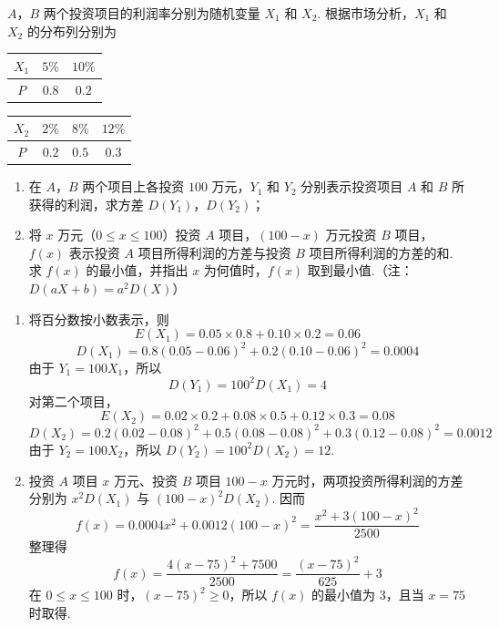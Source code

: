 \begin{problem}
\(A\)，\(B\) 两个投资项目的利润率分别为随机变量 \(X_{1}\) 和 \(X_{2}\). 根据市场分析，\(X_{1}\) 和 \(X_{2}\) 的分布列分别为

\begin{center}
\begin{tabular}{c|cc}
\hline
\(X_1\) & \(5\%\) & \(10\%\) \\
\hline
\(P\) & \(0.8\) & \(0.2\) \\
\hline
\end{tabular}
\qquad
\begin{tabular}{c|ccc}
\hline
\(X_2\) & \(2\%\) & \(8\%\) & \(12\%\) \\
\hline
\(P\) & \(0.2\) & \(0.5\) & \(0.3\) \\
\hline
\end{tabular}
\end{center}

\begin{enumerate}
\item 在 \(A\)，\(B\) 两个项目上各投资 \(100\text{ 万元}\)，\(Y_{1}\) 和 \(Y_{2}\) 分别表示投资项目 \(A\) 和 \(B\) 所获得的利润，求方差 \(D(Y_1)\)，\(D(Y_2)\)；
\item 将 \(x\text{ 万元}\)（\(0 \leqslant x \leqslant 100\)）投资 \(A\) 项目，\((100-x)\text{ 万元}\)投资 \(B\) 项目，\(f(x)\) 表示投资 \(A\) 项目所得利润的方差与投资 \(B\) 项目所得利润的方差的和. 求 \(f(x)\) 的最小值，并指出 \(x\) 为何值时，\(f(x)\) 取到最小值.（注：\(D(aX+b)=a^{2}D(X)\)）
\end{enumerate}

\begin{solution}
\begin{enumerate}
\item 将百分数按小数表示，则
\[
E(X_1)=0.05\times0.8+0.10\times0.2=0.06
\]
\[
D(X_1)=0.8\left(0.05-0.06\right)^2+0.2\left(0.10-0.06\right)^2=0.0004
\]
由于 \(Y_1=100X_1\)，所以
\[
D(Y_1)=100^2D(X_1)=4
\]
对第二个项目，
\[
E(X_2)=0.02\times0.2+0.08\times0.5+0.12\times0.3=0.08
\]
\[
D(X_2)=0.2\left(0.02-0.08\right)^2+0.5\left(0.08-0.08\right)^2+0.3\left(0.12-0.08\right)^2=0.0012
\]
由于 \(Y_2=100X_2\)，所以 \(D(Y_2)=100^2D(X_2)=12\).
\item 投资 \(A\) 项目 \(x\) 万元、投资 \(B\) 项目 \(100-x\) 万元时，两项投资所得利润的方差分别为 \(x^2D(X_1)\) 与 \((100-x)^2D(X_2)\). 因而
\[
f(x)=0.0004x^2+0.0012(100-x)^2
=\frac{x^2+3(100-x)^2}{2500}
\]
整理得
\[
f(x)=\frac{4(x-75)^2+7500}{2500}=\frac{(x-75)^2}{625}+3
\]
在 \(0\le x\le100\) 时，\((x-75)^2\ge0\)，所以 \(f(x)\) 的最小值为 \(3\)，且当 \(x=75\) 时取得.
\end{enumerate}
\end{solution}
\end{problem}

